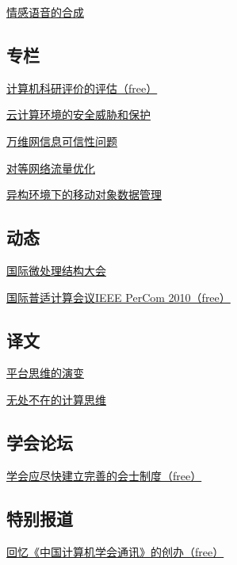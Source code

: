 \documentclass[a4paper]{article}
\begin{document}
\href{http://history.ccf.org.cn/resources/1190201776262/2010/05/12/201005-7.pdf}{情感语音的合成}

\subsection{专栏}
\href{http://history.ccf.org.cn/resources/1190201776262/2010/05/12/201005-8zhuanlan-free.pdf}{计算机科研评价的评估（free）}

\href{http://history.ccf.org.cn/resources/1190201776262/2010/05/12/201005-9.pdf}{云计算环境的安全威胁和保护}

\href{http://history.ccf.org.cn/resources/1190201776262/2010/05/12/201005-10.pdf}{万维网信息可信性问题}

\href{http://history.ccf.org.cn/resources/1190201776262/2010/05/13/201005-11.pdf}{对等网络流量优化}

\href{http://history.ccf.org.cn/resources/1190201776262/2010/05/13/201005-12.pdf}{异构环境下的移动对象数据管理}

\subsection{动态}
\href{http://history.ccf.org.cn/resources/1190201776262/2010/05/13/201005-13dongtai.pdf}{国际微处理结构大会}

\href{http://history.ccf.org.cn/resources/1190201776262/2010/05/13/201005-14-free.pdf}{国际普适计算会议IEEE PerCom 2010（free）}

\subsection{译文}
\href{http://history.ccf.org.cn/resources/1190201776262/2010/05/13/201005-15yiwen.pdf}{平台思维的演变}

\href{http://history.ccf.org.cn/resources/1190201776262/2010/05/13/201005-16.pdf}{无处不在的计算思维}

\subsection{学会论坛}
\href{http://history.ccf.org.cn/resources/1190201776262/2010/05/25/2010.5-92-93.pdf}{学会应尽快建立完善的会士制度（free）}

\subsection{特别报道}
\href{http://history.ccf.org.cn/resources/1190201776262/2010/05/13/201005-18-free.pdf}{回忆《中国计算机学会通讯》的创办（free）}
\end{document}
